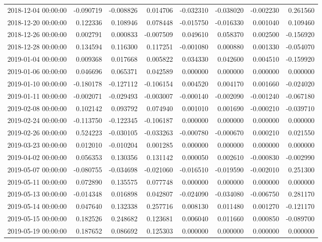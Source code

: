 \begin{tabular}{lrrrrrrr}
2018-12-04 00:00:00 & -0.090719 & -0.008826 & 0.014706 & -0.032310 & -0.038020 & -0.002230 & 0.261560 \\
2018-12-20 00:00:00 & 0.122336 & 0.108946 & 0.078448 & -0.015750 & -0.016330 & 0.001040 & 0.109460 \\
2018-12-26 00:00:00 & 0.002791 & 0.000833 & -0.007509 & 0.049610 & 0.058370 & 0.002500 & -0.156920 \\
2018-12-28 00:00:00 & 0.134594 & 0.116300 & 0.117251 & -0.001080 & 0.000880 & 0.001330 & -0.054070 \\
2019-01-04 00:00:00 & 0.009368 & 0.017668 & 0.005822 & 0.034330 & 0.042600 & 0.004510 & -0.159920 \\
2019-01-06 00:00:00 & 0.046696 & 0.065371 & 0.042589 & 0.000000 & 0.000000 & 0.000000 & 0.000000 \\
2019-01-10 00:00:00 & -0.180178 & -0.127112 & -0.106154 & 0.004520 & 0.004170 & 0.001660 & -0.024020 \\
2019-01-11 00:00:00 & -0.002071 & -0.029493 & -0.003007 & -0.000140 & -0.002090 & -0.001240 & -0.067180 \\
2019-02-08 00:00:00 & 0.102142 & 0.093792 & 0.074940 & 0.001010 & 0.001690 & -0.000210 & -0.039710 \\
2019-02-24 00:00:00 & -0.113750 & -0.122345 & -0.106187 & 0.000000 & 0.000000 & 0.000000 & 0.000000 \\
2019-02-26 00:00:00 & 0.524223 & -0.030105 & -0.033263 & -0.000780 & -0.000670 & 0.000210 & 0.021550 \\
2019-03-23 00:00:00 & 0.012010 & -0.010204 & 0.001285 & 0.000000 & 0.000000 & 0.000000 & 0.000000 \\
2019-04-02 00:00:00 & 0.056353 & 0.130356 & 0.131142 & 0.000050 & 0.002610 & -0.000830 & -0.002990 \\
2019-05-07 00:00:00 & -0.080755 & -0.034698 & -0.021060 & -0.016510 & -0.019590 & -0.002010 & 0.251300 \\
2019-05-11 00:00:00 & 0.072890 & 0.135575 & 0.077748 & 0.000000 & 0.000000 & 0.000000 & 0.000000 \\
2019-05-13 00:00:00 & -0.014348 & 0.016898 & 0.042807 & -0.024090 & -0.034080 & -0.006750 & 0.281170 \\
2019-05-14 00:00:00 & 0.047640 & 0.132338 & 0.257716 & 0.008130 & 0.011480 & 0.001270 & -0.121170 \\
2019-05-15 00:00:00 & 0.182526 & 0.248682 & 0.123681 & 0.006040 & 0.011660 & 0.000850 & -0.089700 \\
2019-05-19 00:00:00 & 0.187652 & 0.086692 & 0.125303 & 0.000000 & 0.000000 & 0.000000 & 0.000000 \\

\end{tabular}
